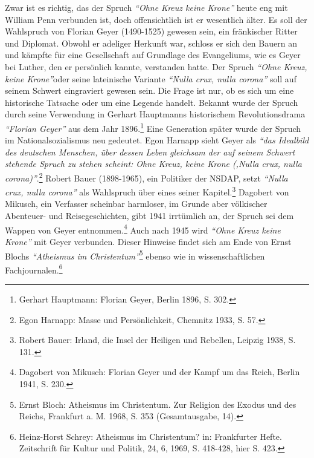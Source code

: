 Zwar ist es richtig, das der Spruch \textit{"`Ohne Kreuz keine Krone"'} heute eng mit
William Penn verbunden ist, doch offensichtlich ist er wesentlich älter. Es soll
der Wahlspruch von Florian Geyer (1490-1525) gewesen sein, ein fränkischer
Ritter und Diplomat. Obwohl er adeliger Herkunft war, schloss er sich den Bauern
an und kämpfte für eine Gesellschaft auf Grundlage des Evangeliums, wie es Geyer
bei Luther, den er persönlich kannte, verstanden hatte. Der Spruch \textit{"`Ohne Kreuz,
keine Krone"'}oder seine lateinische Variante \textit{"`Nulla crux, nulla corona"'} soll
auf seinem Schwert eingraviert gewesen sein. Die Frage ist nur, ob es sich um
eine historische Tatsache oder um eine Legende handelt. Bekannt wurde der Spruch
durch seine Verwendung in Gerhart Hauptmanns historischem Revolutionsdrama
\textit{"`Florian Geyer"'} aus dem Jahr 1896.\footnote{Gerhart Hauptmann: Florian Geyer,
Berlin 1896, S. 302.} Eine Generation später wurde der Spruch im
Nationalsozialismus neu gedeutet. Egon Harnapp sieht Geyer als \textit{"`das Idealbild
des deutschen Menschen, über dessen Leben gleichsam der auf seinem Schwert
stehende Spruch zu stehen scheint: Ohne Kreuz, keine Krone (‚Nulla crux, nulla
corona)"'}.\footnote{Egon Harnapp: Masse und Persönlichkeit, Chemnitz 1933, S. 57.}
Robert Bauer (1898-1965), ein Politiker der NSDAP, setzt \textit{"`Nulla crux, nulla
corona"'} als Wahlspruch über eines seiner Kapitel.\footnote{Robert Bauer:
Irland, die Insel der Heiligen und Rebellen, Leipzig 1938, S.
131.}
Dagobert von Mikusch, ein Verfasser scheinbar harmloser, im Grunde aber
völkischer Abenteuer- und Reisegeschichten, gibt 1941 irrtümlich an, der Spruch
sei dem Wappen von Geyer entnommen.\footnote{Dagobert von Mikusch: Florian Geyer
und der Kampf um das Reich, Berlin
1941, S. 230.} Auch nach 1945 wird \textit{"`Ohne Kreuz keine
Krone"'} mit Geyer verbunden. Dieser Hinweise findet sich am Ende von Ernst
Blochs \textit{"`Atheismus im Christentum"'}\footnote{Ernst Bloch: Atheismus im
Christentum. Zur Religion des Exodus und des
Reichs, Frankfurt a. M. 1968, S. 353 (Gesamtausgabe, 14).} ebenso wie in
wissenschaftlichen Fachjournalen.\footnote{Heinz-Horst Schrey: Atheismus im
Christentum? in: Frankfurter Hefte.
Zeitschrift für Kultur und Politik, 24, 6, 1969, S. 418-428, hier S. 423.}

